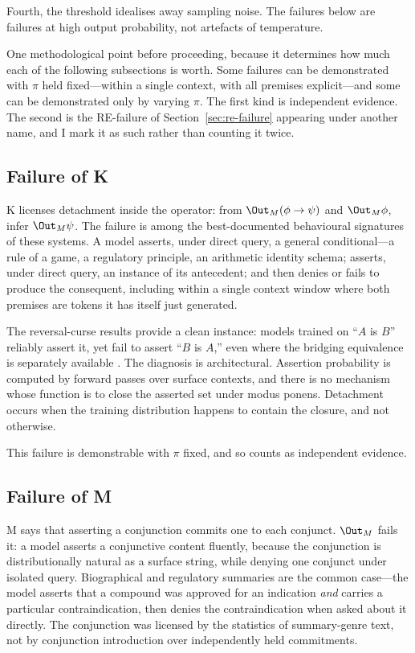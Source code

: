 Fourth, the threshold idealises away sampling noise. The failures below are
failures at high output probability, not artefacts of temperature.

One methodological point before proceeding, because it determines how much each
of the following subsections is worth. Some failures can be demonstrated with
$\pi$ held fixed---within a single context, with all premises explicit---and
some can be demonstrated only by varying $\pi$. The first kind is independent
evidence. The second is the RE-failure of Section~\ref{sec:re-failure} appearing
under another name, and I mark it as such rather than counting it twice.

\subsection{Failure of K}
\label{sec:k-failure}

K licenses detachment inside the operator: from $\Out_M(\phi \rightarrow \psi)$
and $\Out_M \phi$, infer $\Out_M \psi$. The failure is among the
best-documented behavioural signatures of these systems. A model asserts, under
direct query, a general conditional---a rule of a game, a regulatory principle,
an arithmetic identity schema; asserts, under direct query, an instance of its
antecedent; and then denies or fails to produce the consequent, including within
a single context window where both premises are tokens it has itself just
generated.

The reversal-curse results provide a clean instance: models trained on ``$A$ is
$B$'' reliably assert it, yet fail to assert ``$B$ is $A$,'' even where the
bridging equivalence is separately available \citep{berglund2024}. The diagnosis
is architectural. Assertion probability is computed by forward passes over
surface contexts, and there is no mechanism whose function is to close the
asserted set under modus ponens. Detachment occurs when the training
distribution happens to contain the closure, and not otherwise.

This failure is demonstrable with $\pi$ fixed, and so counts as independent
evidence.

\subsection{Failure of M}
\label{sec:m-failure}

M says that asserting a conjunction commits one to each conjunct. $\Out_M$ fails
it: a model asserts a conjunctive content fluently, because the conjunction is
distributionally natural as a surface string, while denying one conjunct under
isolated query. Biographical and regulatory summaries are the common case---the
model asserts that a compound was approved for an indication \emph{and} carries a
particular contraindication, then denies the contraindication when asked about it
directly. The conjunction was licensed by the statistics of summary-genre text,
not by conjunction introduction over independently held commitments.

